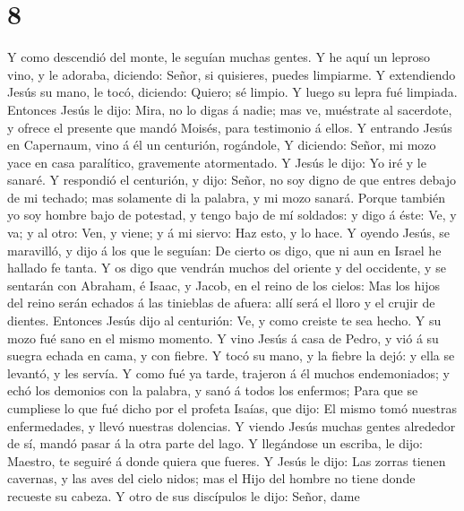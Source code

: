 \hypertarget{section-7}{%
\section{8}\label{section-7}}

 Y como descendió del monte, le seguían muchas gentes.
 Y he aquí un leproso vino, y le adoraba, diciendo: Señor,
si quisieres, puedes limpiarme.  Y extendiendo Jesús su
mano, le tocó, diciendo: Quiero; sé limpio. Y luego su lepra fué
limpiada.  Entonces Jesús le dijo: Mira, no lo digas á
nadie; mas ve, muéstrate al sacerdote, y ofrece el presente que mandó
Moisés, para testimonio á ellos.  Y entrando Jesús en
Capernaum, vino á él un centurión, rogándole,  Y diciendo:
Señor, mi mozo yace en casa paralítico, gravemente atormentado.
 Y Jesús le dijo: Yo iré y le sanaré.  Y
respondió el centurión, y dijo: Señor, no soy digno de que entres debajo
de mi techado; mas solamente di la palabra, y mi mozo sanará.
 Porque también yo soy hombre bajo de potestad, y tengo bajo
de mí soldados: y digo á éste: Ve, y va; y al otro: Ven, y viene; y á mi
siervo: Haz esto, y lo hace.  Y oyendo Jesús, se maravilló,
y dijo á los que le seguían: De cierto os digo, que ni aun en Israel he
hallado fe tanta.  Y os digo que vendrán muchos del oriente
y del occidente, y se sentarán con Abraham, é Isaac, y Jacob, en el
reino de los cielos:  Mas los hijos del reino serán echados
á las tinieblas de afuera: allí será el lloro y el crujir de dientes.
 Entonces Jesús dijo al centurión: Ve, y como creiste te
sea hecho. Y su mozo fué sano en el mismo momento.  Y vino
Jesús á casa de Pedro, y vió á su suegra echada en cama, y con fiebre.
 Y tocó su mano, y la fiebre la dejó: y ella se levantó, y
les servía.  Y como fué ya tarde, trajeron á él muchos
endemoniados; y echó los demonios con la palabra, y sanó á todos los
enfermos;  Para que se cumpliese lo que fué dicho por el
profeta Isaías, que dijo: El mismo tomó nuestras enfermedades, y llevó
nuestras dolencias.  Y viendo Jesús muchas gentes alrededor
de sí, mandó pasar á la otra parte del lago.  Y llegándose
un escriba, le dijo: Maestro, te seguiré á donde quiera que fueres.
 Y Jesús le dijo: Las zorras tienen cavernas, y las aves
del cielo nidos; mas el Hijo del hombre no tiene donde recueste su
cabeza.  Y otro de sus discípulos le dijo: Señor, dame
